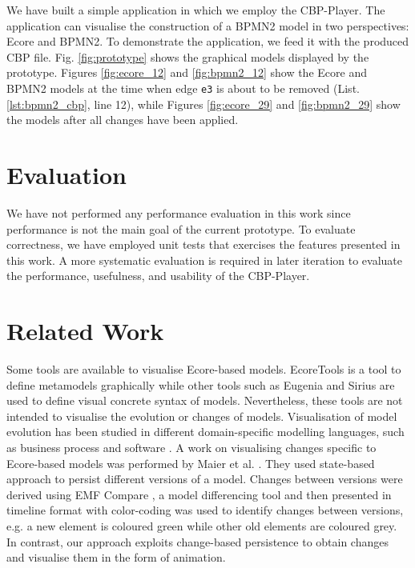 \documentclass[conference]{IEEEtran}
\begin{document}
We have built a simple application in which we employ the CBP-Player. 
The application can visualise the construction of a BPMN2 model in two perspectives: Ecore and BPMN2. 
To demonstrate the application, we feed it with the produced CBP file. 
Fig. \ref{fig:prototype} shows the graphical models displayed by the prototype. 
Figures \ref{fig:ecore_12} and \ref{fig:bpmn2_12} show the Ecore and BPMN2 models at the time when edge \texttt{e3} 
is about to be removed (List. \ref{lst:bpmn2_cbp}, line 12), while 
Figures \ref{fig:ecore_29} and \ref{fig:bpmn2_29} show the models after all changes have been applied.

\section{Evaluation}
\label{sec:evaluation}
We have not performed any performance evaluation in this work 
since performance is not the main goal of the current prototype.
To evaluate correctness, we have employed unit tests that exercises the features 
presented in this work. A more systematic evaluation is required in later iteration 
to evaluate the performance, usefulness, and usability of the CBP-Player.

\section{Related Work}
\label{sec:related_work}
Some tools are available to visualise Ecore-based models. 
EcoreTools \cite{eclipse2019ecoretools} is a tool to define metamodels graphically while other tools such as
Eugenia \cite{Kolovos2017} and Sirius \cite{eclipse2019sirius} are used 
to define visual concrete syntax of models.
Nevertheless, these tools are not intended to visualise the evolution or changes of models. 
Visualisation of model evolution has been studied in different domain-specific
modelling languages, such as business process \cite{fritscher2014visualizing}
and software \cite{Mattila:2016:SVT:2994310.2994327}. A work on visualising changes specific to Ecore-based models 
was performed by Maier et al. \cite{maier2015recording}. 
They used state-based approach to persist different versions of a model.
Changes between versions were derived using EMF Compare \cite{eclipse2017compare}, 
a model differencing tool and then presented 
in timeline format with color-coding was used 
to identify changes between versions, e.g. a new element is coloured green
while other old elements are coloured grey. In contrast, our approach
exploits change-based persistence to obtain changes and visualise them in
the form of animation.
\end{document}
